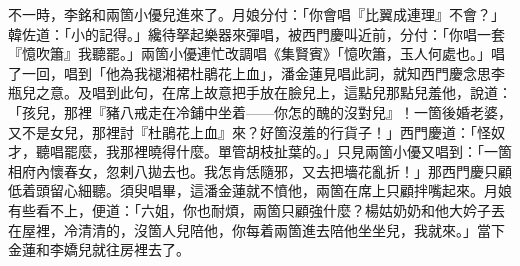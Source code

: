 不一時，李銘和兩箇小優兒進來了。月娘分付：「你會唱『比翼成連理』不會？」韓佐道：「小的記得。」纔待拏起樂器來彈唱，被西門慶叫近前，分付：「你唱一套『憶吹簫』我聽罷。」兩箇小優連忙改調唱《集賢賓》「憶吹簫，玉人何處也。」唱了一回，唱到「他為我褪湘裙杜鵑花上血」，潘金蓮見唱此詞，就知西門慶念思李瓶兒之意。{}及唱到此句，在席上故意把手放在臉兒上，這點兒那點兒羞他，{}說道：「孩兒，那裡『豬八戒走在冷鋪中坐着——你怎的醜的沒對兒』！一箇後婚老婆，又不是女兒，那裡討『杜鵑花上血』來？好箇沒羞的行貨子！」西門慶道：「怪奴才，聽唱罷麼，我那裡曉得什麼。單管胡枝扯葉的。」只見兩箇小優又唱到：「一箇相府內懷春女，忽剌八拋去也。我怎肯恁隨邪，又去把墻花亂折！」那西門慶只顧低着頭留心細聽。{}須臾唱畢，這潘金蓮就不憤他，兩箇在席上只顧拌嘴起來。月娘有些看不上，便道：「六姐，你也耐煩，兩箇只顧強什麼？楊姑奶奶和他大妗子丟在屋裡，冷清清的，沒箇人兒陪他，你每着兩箇進去陪他坐坐兒，我就來。」當下金蓮和李嬌兒就往房裡去了。

